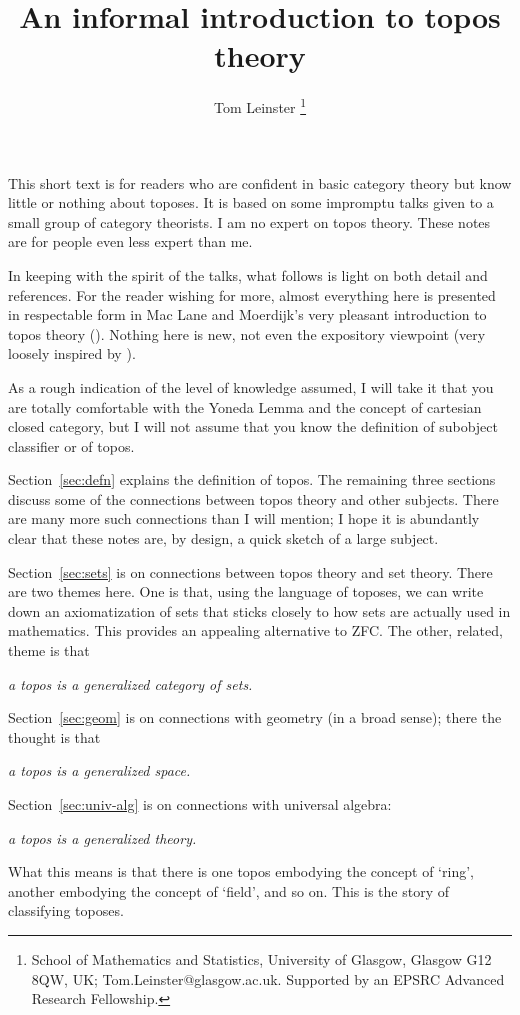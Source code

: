 \documentclass[12pt]{article}
\title{An informal introduction to topos theory}
\author{Tom Leinster%
\thanks{School of Mathematics and Statistics, University of Glasgow, Glasgow
G12 8QW, UK;
Tom.Leinster@glasgow.ac.uk.  Supported by an EPSRC Advanced Research
Fellowship.}}
\date{}
\newcommand{\slogan}[1]{\begin{center}\it #1\end{center}}
\begin{document}
\maketitle

\vspace*{10mm}
\tableofcontents
\vspace*{12mm}

\newpage

\noindent
This short text is for readers who are confident in basic category theory but
know little or nothing about toposes.  It is based on some impromptu talks
given to a small group of category theorists.  I am no expert on topos theory.
These notes are for people even less expert than me.

In keeping with the spirit of the talks, what follows is light on both detail
and references.  For the reader wishing for more, almost everything
here is presented in respectable form in Mac Lane and Moerdijk's very pleasant
introduction to topos theory (\citeyear{MaMo}).  Nothing here is new, not even
the expository viewpoint (very loosely inspired by \citet{JohSE}).

As a rough indication of the level of knowledge assumed, I will take it that
you are totally comfortable with the Yoneda Lemma and the concept of
cartesian closed category, but I will not assume that you know the definition
of subobject classifier or of topos.

Section~\ref{sec:defn} explains the definition of topos.  The remaining three
sections discuss some of the connections between topos theory and other
subjects.  There are many more such connections than I will mention; I hope it
is abundantly clear that these notes are, by design, a quick sketch of a
large subject.

Section~\ref{sec:sets} is on connections between topos theory and set theory.
There are two themes here.  One is that, using the language of toposes, we can
write down an axiomatization of sets that sticks closely to how sets are
actually used in mathematics.  This provides an appealing alternative to ZFC.
The other, related, theme is that 
% 
\slogan{a topos is a generalized category of sets.}

Section~\ref{sec:geom} is on connections with geometry (in a broad sense);
there the thought is that
% 
\slogan{a topos is a generalized space.}

Section~\ref{sec:univ-alg} is on connections with universal algebra:
% 
\slogan{a topos is a generalized theory.}
% 
What this means is that there is one topos embodying the concept of `ring',
another embodying the concept of `field', and so on.  This is the story of
classifying toposes.
\end{document}
